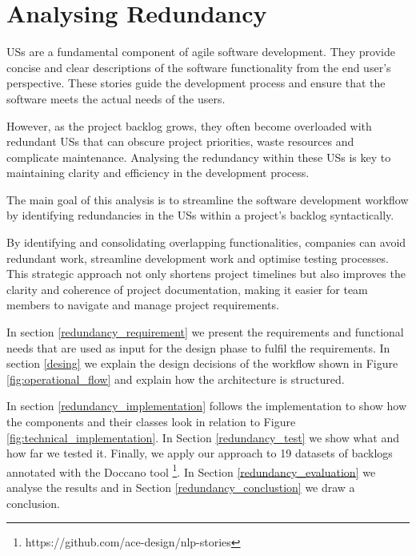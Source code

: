 \section{Analysing Redundancy}\label{redundancy}
USs are a fundamental component of agile software development. They provide concise and clear descriptions of the software functionality from the end user's perspective. These stories guide the development process and ensure that the software meets the actual needs of the users. 

However, as the project backlog grows, they often become overloaded with redundant USs that can obscure project priorities, waste resources and complicate maintenance. Analysing the redundancy within these USs is key to maintaining clarity and efficiency in the development process.

The main goal of this analysis is to streamline the software development workflow by identifying redundancies in the USs within a project's backlog syntactically.

 By identifying and consolidating overlapping functionalities, companies can avoid redundant work, streamline development work and optimise testing processes. This strategic approach not only shortens project timelines but also improves the clarity and coherence of project documentation, making it easier for team members to navigate and manage project requirements.

In section \ref{redundancy_requirement} we present the requirements and functional needs that are used as input for the design phase to fulfil the requirements. In section \ref{desing} we explain the design decisions of the workflow shown in Figure \ref{fig:operational_flow} and explain how the architecture is structured. 

In section \ref{redundancy_implementation} follows the implementation to show how the components and their classes look in relation to Figure \ref{fig:technical_implementation}. In Section \ref{redundancy_test} we show what and how far we tested it. Finally, we apply our approach to 19 datasets of backlogs annotated with the Doccano tool \footnote {https://github.com/ace-design/nlp-stories}. In Section \ref{redundancy_evaluation} we analyse the results and in Section \ref{redundancy_conclustion} we draw a conclusion. 
